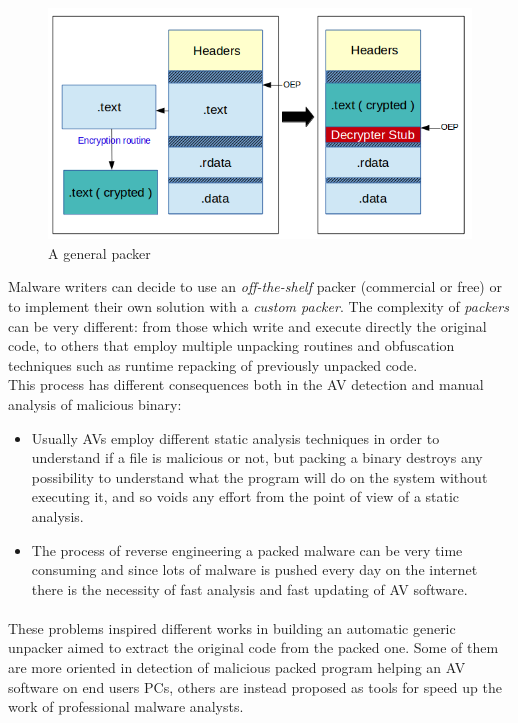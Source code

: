 \begin{figure}[!ht]
	\begin{center}
   		\includegraphics[width=\textwidth]{pictures/packer_general.png}
	\end{center}
	\caption{A general packer}
\end{figure}
Malware writers can decide to use an \textit{off-the-shelf} packer (commercial or free) or to implement their own solution with a \textit{custom packer}. The complexity of \textit{packers} can be very different: from those which write and execute directly the original code, to others that employ multiple unpacking routines and obfuscation techniques such as runtime repacking of previously unpacked code.\\
This process has different consequences both in the \ac{AV} detection and manual analysis of malicious binary:
\begin{itemize}
\item Usually \acp{AV} employ different static analysis techniques in order to understand if a file is malicious or not, but packing a binary destroys any possibility to understand what the program will do on the system without executing it, and so voids any effort from the point of view of a static analysis.
\item The process of reverse engineering a packed malware can be very time consuming and since lots of malware is pushed every day on the internet there is the necessity of fast analysis and fast updating of \ac{AV} software.
\end{itemize}
\paragraph{}
These problems inspired different works in building an automatic generic unpacker aimed to extract the original code from the packed one. Some of them are more oriented in detection of malicious packed program helping an \ac{AV} software on end users PCs, others are instead proposed as tools for speed up the work of professional malware analysts.
